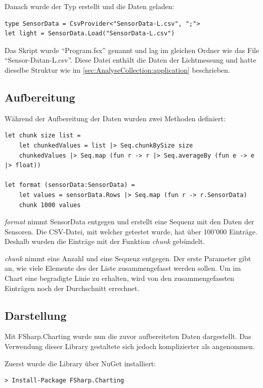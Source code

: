 Danach wurde der Typ erstellt und die Daten geladen:
\begin{lstlisting}
type SensorData = CsvProvider<"SensorData-L.csv", ";">
let light = SensorData.Load("SensorData-L.csv")
\end{lstlisting}

Das Skript wurde "`Program.fsx"' genannt und lag im gleichen Ordner wie das File "`Sensor-Datan-L.csv"'. Diese Datei enthält die Daten der Lichtmessung und hatte dieselbe Struktur wie im \cref{sec:AnalyseCollection:application}  beschrieben.

\subsection{Aufbereitung}
\label{sec:display:documentation:manipulation}
Während der Aufbereitung der Daten wurden zwei Methoden definiert:
\begin{lstlisting}
let chunk size list =
    let chunkedValues = list |> Seq.chunkBySize size
    chunkedValues |> Seq.map (fun r -> r |> Seq.averageBy (fun e -> e |> float))

let format (sensorData:SensorData) =
    let values = sensorData.Rows |> Seq.map (fun r -> r.SensorData)
    chunk 1000 values
\end{lstlisting}

\textit{format} nimmt SensorData entgegen und erstellt eine Sequenz mit den Daten der Sensoren. Die CSV-Datei, mit welcher getestet wurde, hat über 100'000 Einträge. Deshalb wurden die Einträge mit der Funktion \textit{chunk} gebündelt.

\textit{chunk} nimmt eine Anzahl und eine Sequenz entgegen. Der erste Parameter gibt an, wie viele Elemente des der Liste zusammengefasst werden sollen. Um im Chart eine begradigte Linie zu erhalten, wird von den zusammengefassten Einträgen noch der Durchschnitt errechnet.

\subsection{Darstellung}
Mit FSharp.Charting wurde nun die zuvor aufbereiteten Daten dargestellt.
Das Verwendung dieser Library gestaltete sich jedoch komplizierter als angenommen.

Zuerst wurde die Library über NuGet installiert:
\begin{lstlisting}
> Install-Package FSharp.Charting 
\end{lstlisting}

